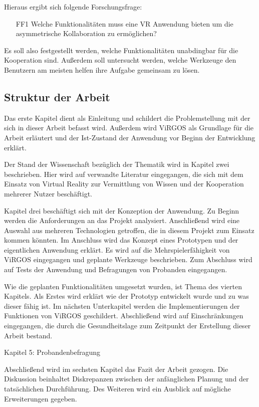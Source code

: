Hieraus ergibt sich folgende Forschungsfrage:

\begin{itemize}
\item[FF1] \label{FF1} Welche Funktionalitäten muss eine VR Anwendung bieten um die asymmetrische Kollaboration zu ermöglichen?
\end{itemize}

Es soll also festgestellt werden, welche Funktionalitäten unabdingbar für die Kooperation sind. Außerdem soll untersucht werden, welche Werkzeuge den Benutzern am meisten helfen ihre Aufgabe gemeinsam zu lösen.


\subsection{Struktur der Arbeit}
Das erste Kapitel dient als Einleitung und schildert die Problemstellung mit der sich in dieser Arbeit befasst wird. Außerdem wird ViRGOS als Grundlage für die Arbeit erläutert und der Ist-Zustand der Anwendung vor Beginn der Entwicklung erklärt. \newline

Der Stand der Wissenschaft bezüglich der Thematik wird in Kapitel zwei beschrieben. Hier wird auf verwandte Literatur eingegangen, die sich mit dem Einsatz von Virtual Reality zur Vermittlung von Wissen und der Kooperation mehrerer Nutzer beschäftigt. \newline

Kapitel drei beschäftigt sich mit der Konzeption der Anwendung. Zu Beginn werden die Anforderungen an das Projekt analysiert. Anschließend wird eine Auswahl aus mehreren Technologien getroffen, die in diesem Projekt zum Einsatz kommen könnten. Im Anschluss wird das Konzept eines Prototypen und der eigentlichen Anwendung erklärt. Es wird auf die Mehrspielerfähigkeit von ViRGOS eingegangen und geplante Werkzeuge beschrieben. Zum Abschluss wird auf Tests der Anwendung und Befragungen von Probanden eingegangen. \newline

Wie die geplanten Funktionalitäten umgesetzt wurden, ist Thema des vierten Kapitels. Als Erstes wird erklärt wie der Prototyp entwickelt wurde und zu was dieser fähig ist. Im nächsten Unterkapitel werden die Implementierungen der Funktionen von ViRGOS geschildert. Abschließend wird auf Einschränkungen eingegangen, die durch die Gesundheitslage zum Zeitpunkt der Erstellung dieser Arbeit bestand. \newline

Kapitel 5: Probandenbefragung  \newline

Abschließend wird im sechsten Kapitel das Fazit der Arbeit gezogen. Die Diskussion beinhaltet Diskrepanzen zwischen der anfänglichen Planung und der tatsächlichen Durchführung. Des Weiteren wird ein Ausblick auf mögliche Erweiterungen gegeben.